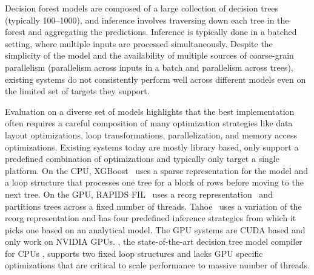 Decision forest models are composed of a large collection of decision trees (typically 100--1000), and inference involves 
traversing down each tree in the forest and aggregating the predictions. Inference is typically done in a batched
setting, where multiple inputs are processed simultaneously.
Despite the simplicity of the model and the availability of multiple sources of coarse-grain parallelism (parallelism 
across inputs in a batch and parallelism across trees), existing systems do not consistently perform well across different
models even on the limited set of targets they support. 

Evaluation on a diverse set of models highlights that the best implementation often requires a careful composition 
of many optimization strategies like data layout optimizations, 
loop transformations, parallelization, and memory access optimizations. 
Existing systems today are mostly library based, only support a predefined combination of optimizations
and typically only target a single platform. 
On the CPU, XGBoost~\cite{XGBoost} uses a sparse representation for the model 
and a loop structure that processes one tree for a block of rows before moving to 
the next tree. On the GPU, RAPIDS FIL~\cite{FIL} uses a reorg representation~\cite{FIL}
and partitions trees across a fixed number of threads. 
Tahoe~\cite{Tahoe} uses a variation of the reorg representation and 
has four predefined inference strategies from which it picks one based on an analytical model.
The GPU systems are CUDA based and only work on NVIDIA GPUs.
\TreebeardOLD{}, the state-of-the-art decision tree model compiler for CPUs
, supports two fixed loop structures 
and lacks GPU specific optimizations that are critical to scale performance to massive number of threads.

